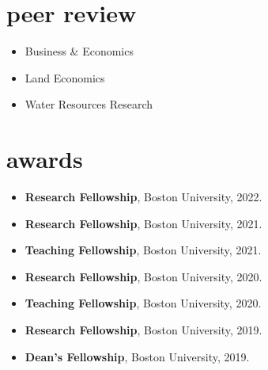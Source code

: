 \documentclass[10pt,oneside]{article}
\begin{document}

\section{peer review}

\mbox{}\vspace{-\dimexpr\baselineskip\relax}

\begin{itemize}[label={}]
  
    \item Business \& Economics
  
    \item Land Economics
  
    \item Water Resources Research
  
\end{itemize}


\section{awards}

\mbox{}\vspace{-\dimexpr\baselineskip\relax}

\begin{itemize}[label={}]
  
  \item \textbf{Research Fellowship}, Boston University, 2022.
        
  \item \textbf{Research Fellowship}, Boston University, 2021.
        
  \item \textbf{Teaching Fellowship}, Boston University, 2021.
        
  \item \textbf{Research Fellowship}, Boston University, 2020.
        
  \item \textbf{Teaching Fellowship}, Boston University, 2020.
        
  \item \textbf{Research Fellowship}, Boston University, 2019.
        
  \item \textbf{Dean's Fellowship}, Boston University, 2019.
        
\end{itemize}
\end{document}
